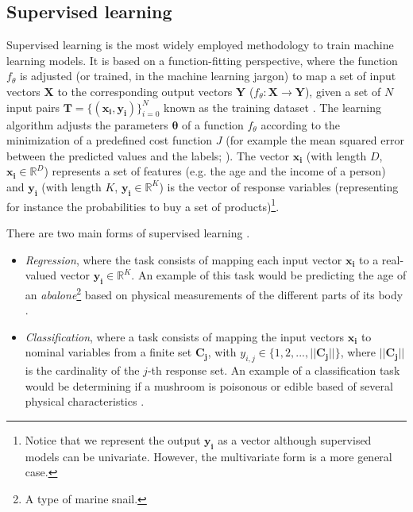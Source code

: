 \subsection{Supervised learning}
Supervised learning is the most widely employed methodology to train machine learning models. It is based on a function-fitting perspective, where the function $f_\theta$ is adjusted (or trained, in the machine learning jargon) to map a set of input vectors $\mathbf{X}$ to the corresponding output vectors $\mathbf{Y}$ ($f_\theta:\mathbf{X}\rightarrow \mathbf{Y}$), given a set of $N$ input pairs $\mathbf{T}=\{(\mathbf{x_i},\mathbf{y_i})\}_{i=0}^{N}$ known as the training dataset \autocite{theodoridis2015}. The learning algorithm adjusts the parameters $\mathbf{\theta}$ of a function $f_\theta$ according to the minimization of a predefined cost function $J$ (for example the mean squared error between the predicted values and the labels; \citealp{hastie2009}). The vector $\mathbf{x_i}$ (with length $D$, $\mathbf{x_i} \in \mathbb{R}^D$) represents a set of features (e.g. the age and the income of a person)  and $\mathbf{y_i}$ (with length $K$, $\mathbf{y_i}\in\mathbb{R}^K$) is the vector of response variables (representing for instance the probabilities to buy a set of products)\footnote{Notice that we represent the output $\mathbf{y_i}$ as a vector although supervised models can be univariate. However, the multivariate form is a more general case.}.

There are two main forms of supervised learning  \autocite{murphy2012}.

\begin{itemize}
	\item \textit{Regression}, where the task consists of mapping each input vector $\mathbf{x_i}$ to a real-valued vector $\mathbf{y_i} \in \mathbb{R}^K$. An example of this task would be predicting the age of an \textit{abalone}\footnote{A type of marine snail.} based on physical measurements of the different parts of its body \autocite{dua2019abalone}.
	\item \textit{Classification}, where a task consists of mapping the input vectors $\mathbf{x_i}$ to nominal variables from a finite set $\mathbf{C_j}$, with $y_{i,j} \in \{1,2,...,||\mathbf{C_j}||\}$, where $||\mathbf{C_j}||$ is the cardinality of the $j$-th response set. An example of a classification task would be determining if a mushroom is poisonous or edible based of several physical characteristics \autocite{dua2019abalone}.
\end{itemize}

